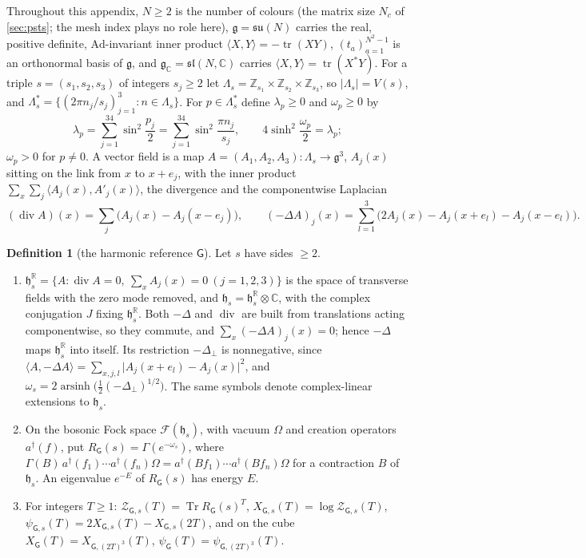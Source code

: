 \documentclass[11pt,a4paper]{amsart}
\theoremstyle{definition}
\newtheorem{definition}[theorem]{Definition}
\theoremstyle{remark}
\numberwithin{equation}{section}
\DeclareMathOperator{\Tr}{Tr}        %
\DeclareMathOperator{\tr}{tr}        %
\newcommand{\R}{\mathbb{R}}          %
\newcommand{\C}{\mathbb{C}}          %
\newcommand{\Z}{\mathbb{Z}}          %
\newcommand{\ip}[2]{\langle #1,#2\rangle}  %
\newcommand{\abs}[1]{\lvert #1\rvert}      %
\newcommand{\TT}{\mathbb{T}}               %
\newcommand{\Zc}{\mathcal{Z}}              %
\newcommand{\Zs}[2]{\Zc_{#1}(#2)}          %
\newcommand{\XT}[2]{X_{#1}(#2)}            %
\newcommand{\psiT}[2]{\psi_{#1}(#2)}       %
\newcommand{\Vol}[1]{V(#1)}                %
\newcommand{\cube}[1]{(2#1)^3}             %
\newcommand{\Gharm}{\mathsf{G}}            %
\begin{document}
Throughout this appendix, $N\ge2$ is the number of colours (the matrix size $N_c$ of \cref{sec:psts}; the mesh index plays no role here), $\mathfrak g=\mathfrak{su}(N)$ carries the real, positive definite, $\mathrm{Ad}$-invariant inner product $\ip{X}{Y}=-\tr(XY)$, $(t_a)_{a=1}^{N^2-1}$ is an orthonormal basis of $\mathfrak g$, and $\mathfrak g_\C=\mathfrak{sl}(N,\C)$ carries $\ip{X}{Y}=\tr(X^*Y)$. For a triple $s=(s_1,s_2,s_3)$ of integers $s_j\ge2$ let $\Lambda_s=\Z_{s_1}\times\Z_{s_2}\times\Z_{s_3}$, so $\abs{\Lambda_s}=\Vol{s}$, and $\Lambda_s^*=\{(2\pi n_j/s_j)_{j=1}^3:n\in\Lambda_s\}$. For $p\in\Lambda_s^*$ define $\lambda_p\ge0$ and $\omega_p\ge0$ by
\[
 \lambda_p=\sum_{j=1}^34\sin^2\frac{p_j}2=\sum_{j=1}^34\sin^2\frac{\pi n_j}{s_j},\qquad 4\sinh^2\frac{\omega_p}2=\lambda_p ;
\]
$\omega_p>0$ for $p\ne0$. A vector field is a map $A=(A_1,A_2,A_3):\Lambda_s\to\mathfrak g^3$, $A_j(x)$ sitting on the link from $x$ to $x+e_j$, with the inner product $\sum_x\sum_j\ip{A_j(x)}{A'_j(x)}$, the divergence and the componentwise Laplacian
\[
 (\operatorname{div}A)(x)=\sum_j\bigl(A_j(x)-A_j(x-e_j)\bigr),\qquad (-\Delta A)_j(x)=\sum_{l=1}^3\bigl(2A_j(x)-A_j(x+e_l)-A_j(x-e_l)\bigr).
\]

\begin{definition}[the harmonic reference $\Gharm$]\label{def:harmonic}
Let $s$ have sides $\ge2$.
\begin{enumerate}[label=(\roman*)]
\item $\mathfrak h^{\R}_s=\{A:\operatorname{div}A=0,\ \sum_xA_j(x)=0\ (j=1,2,3)\}$ is the space of transverse fields with the zero mode removed, and $\mathfrak h_s=\mathfrak h^{\R}_s\otimes\C$, with the complex conjugation $J$ fixing $\mathfrak h^{\R}_s$. Both $-\Delta$ and $\operatorname{div}$ are built from translations acting componentwise, so they commute, and $\sum_x(-\Delta A)_j(x)=0$; hence $-\Delta$ maps $\mathfrak h^{\R}_s$ into itself. Its restriction $-\Delta_\perp$ is nonnegative, since $\ip{A}{-\Delta A}=\sum_{x,j,l}\abs{A_j(x+e_l)-A_j(x)}^2$, and $\omega_s=2\operatorname{arsinh}\bigl(\tfrac12(-\Delta_\perp)^{1/2}\bigr)$. The same symbols denote complex-linear extensions to $\mathfrak h_s$.
\item On the bosonic Fock space $\mathcal F(\mathfrak h_s)$, with vacuum $\Omega$ and creation operators $a^\dagger(f)$, put $R_{\Gharm}(s)=\Gamma(e^{-\omega_s})$, where $\Gamma(B)\,a^\dagger(f_1)\cdots a^\dagger(f_n)\Omega=a^\dagger(Bf_1)\cdots a^\dagger(Bf_n)\Omega$ for a contraction $B$ of $\mathfrak h_s$. An eigenvalue $e^{-E}$ of $R_{\Gharm}(s)$ has energy $E$.
\item For integers $T\ge1$: $\Zs{\Gharm,s}{T}=\Tr R_{\Gharm}(s)^T$, $\XT{\Gharm,s}{T}=\log\Zs{\Gharm,s}{T}$, $\psiT{\Gharm,s}{T}=2\XT{\Gharm,s}{T}-\XT{\Gharm,s}{2T}$, and on the cube $\XT{\Gharm}{T}=\XT{\Gharm,\cube{T}}{T}$, $\psiT{\Gharm}{T}=\psiT{\Gharm,\cube{T}}{T}$.
\end{enumerate}
\end{definition}
\end{document}
